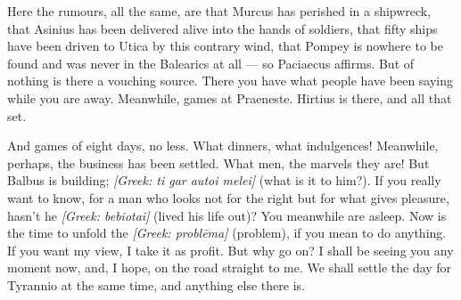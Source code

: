 

 Here the rumours, all the same, are that Murcus has perished in a shipwreck, that Asinius has been delivered alive into the hands of soldiers, that fifty ships have been driven to Utica by this contrary wind, that Pompey is nowhere to be found and was never in the Balearics at all --- so Paciaecus affirms. But of nothing is there a vouching source. There you have what people have been saying while you are away. Meanwhile, games at Praeneste. Hirtius is there, and all that set.

 And games of eight days, no less. What dinners, what indulgences! Meanwhile, perhaps, the business has been settled. What men, the marvels they are! But Balbus is building; \textit{[Greek: ti gar autoi melei]} (what is it to him?). If you really want to know, for a man who looks not for the right but for what gives pleasure, hasn't he \textit{[Greek: bebiotai]} (lived his life out)? You meanwhile are asleep. Now is the time to unfold the \textit{[Greek: probl\=ema]} (problem), if you mean to do anything. If you want my view, I take it as profit. But why go on? I shall be seeing you any moment now, and, I hope, on the road straight to me. We shall settle the day for Tyrannio at the same time, and anything else there is.

